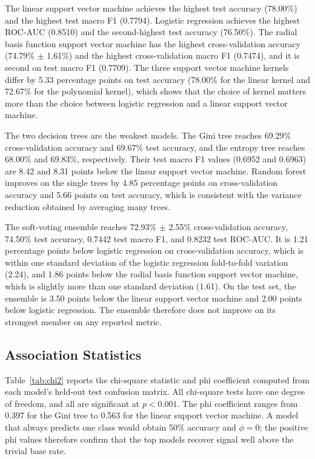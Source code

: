 \documentclass[conference]{IEEEtran}
\begin{document}
The linear support vector machine achieves the highest test accuracy (78.00\%) and the highest test macro F1 (0.7794). Logistic regression achieves the highest ROC-AUC (0.8510) and the second-highest test accuracy (76.50\%). The radial basis function support vector machine has the highest cross-validation accuracy (74.79\% \(\pm\) 1.61\%) and the highest cross-validation macro F1 (0.7474), and it is second on test macro F1 (0.7709). The three support vector machine kernels differ by 5.33 percentage points on test accuracy (78.00\% for the linear kernel and 72.67\% for the polynomial kernel), which shows that the choice of kernel matters more than the choice between logistic regression and a linear support vector machine.

The two decision trees are the weakest models. The Gini tree reaches 69.29\% cross-validation accuracy and 69.67\% test accuracy, and the entropy tree reaches 68.00\% and 69.83\%, respectively. Their test macro F1 values (0.6952 and 0.6963) are 8.42 and 8.31 points below the linear support vector machine. Random forest improves on the single trees by 4.85 percentage points on cross-validation accuracy and 5.66 points on test accuracy, which is consistent with the variance reduction obtained by averaging many trees.

The soft-voting ensemble reaches 72.93\% \(\pm\) 2.55\% cross-validation accuracy, 74.50\% test accuracy, 0.7442 test macro F1, and 0.8232 test ROC-AUC. It is 1.21 percentage points below logistic regression on cross-validation accuracy, which is within one standard deviation of the logistic regression fold-to-fold variation (2.24), and 1.86 points below the radial basis function support vector machine, which is slightly more than one standard deviation (1.61). On the test set, the ensemble is 3.50 points below the linear support vector machine and 2.00 points below logistic regression. The ensemble therefore does not improve on its strongest member on any reported metric.

\subsection{Association Statistics}

Table~\ref{tab:chi2} reports the chi-square statistic and phi coefficient computed from each model's held-out test confusion matrix. All chi-square tests have one degree of freedom, and all are significant at \(p<0.001\). The phi coefficient ranges from 0.397 for the Gini tree to 0.563 for the linear support vector machine. A model that always predicts one class would obtain 50\% accuracy and \(\phi=0\); the positive phi values therefore confirm that the top models recover signal well above the trivial base rate.
\end{document}
